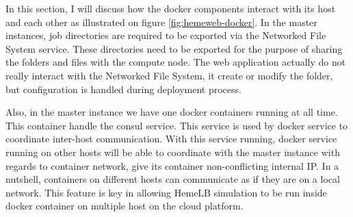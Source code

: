 \vspace{1cm}

\noindent%
\begin{minipage}{\linewidth}%
\label{fig:hemeweb-docker}%
\end{minipage}

\vspace{1cm}

In this section, I will discuss how the docker components interact with its host and each other as illustrated on figure \ref{fig:hemeweb-docker}. In the master instances, job directories are required to be exported via the Networked File System service. These directories need to be exported for the purpose of sharing the folders and files with the compute node. The web application actually do not really interact with the Networked File System, it create or modify the folder, but configuration is handled during deployment process.

Also, in the master instance we have one docker containers running at all time. This container handle the consul service. This service is used by docker service to coordinate inter-host communication. With this service running, docker service running on other hosts will be able to coordinate with the master instance with regards to container network, give its container non-conflicting internal IP. In a nutshell, containers on different hosts can communicate as if they are on a local network. This feature is key in allowing HemeLB simulation to be run inside docker container on multiple host on the cloud platform.

